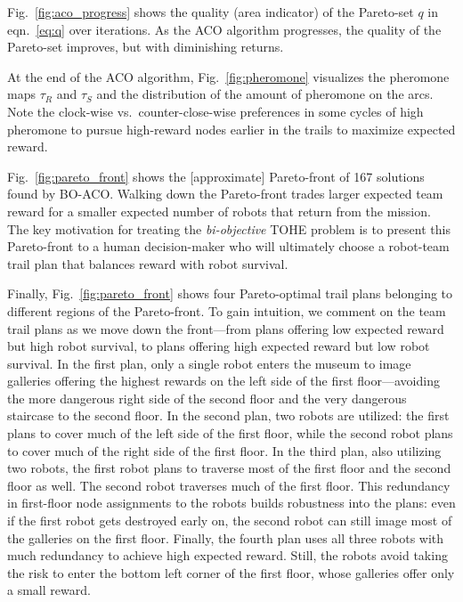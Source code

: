 \documentclass[11pt, oneside]{article}
\begin{document}
Fig.~\ref{fig:aco_progress} shows the quality (area indicator) of the Pareto-set $q$ in eqn.~\ref{eq:q} over iterations. As the ACO algorithm progresses, the quality of the Pareto-set improves, but with diminishing returns. 

At the end of the ACO algorithm, Fig.~\ref{fig:pheromone} visualizes the pheromone maps $\tau_{R}$ and $\tau_S$ and the distribution of the amount of pheromone on the arcs. 
Note the clock-wise vs.\ counter-close-wise preferences in some cycles of high pheromone to pursue high-reward nodes earlier in the trails to maximize expected reward.

Fig.~\ref{fig:pareto_front} shows the [approximate] Pareto-front of 167 solutions found by BO-ACO. 
Walking down the Pareto-front trades larger expected team reward for a smaller expected number of robots that return from the mission. The key motivation for treating the \emph{bi-objective} TOHE problem is to present this Pareto-front to a human decision-maker who will ultimately choose a robot-team trail plan that balances reward with robot survival.

Finally, Fig.~\ref{fig:pareto_front} shows four Pareto-optimal trail plans belonging to different regions of the Pareto-front. 
To gain intuition, we comment on the team trail plans as we move down the front---from plans offering low expected reward but high robot survival, to plans offering high expected reward but low robot survival. 
In the first plan, only a single robot enters the museum to image galleries offering the highest rewards on the left side of the first floor---avoiding the more dangerous right side of the second floor and the very dangerous staircase to the second floor. 
In the second plan, two robots are utilized: the first plans to cover much of the left side of the first floor, while the second robot plans to cover much of the right side of the first floor.
In the third plan, also utilizing two robots, the first robot plans to traverse most of the first floor and the second floor as well. The second robot traverses much of the first floor. This redundancy in first-floor node assignments to the robots builds robustness into the plans: even if the first robot gets destroyed early on, the second robot can still image most of the galleries on the first floor.
Finally, the fourth plan uses all three robots with much redundancy to achieve high expected reward. Still, the robots avoid taking the risk to enter the bottom left corner of the first floor, whose galleries offer only a small reward.
\end{document}
